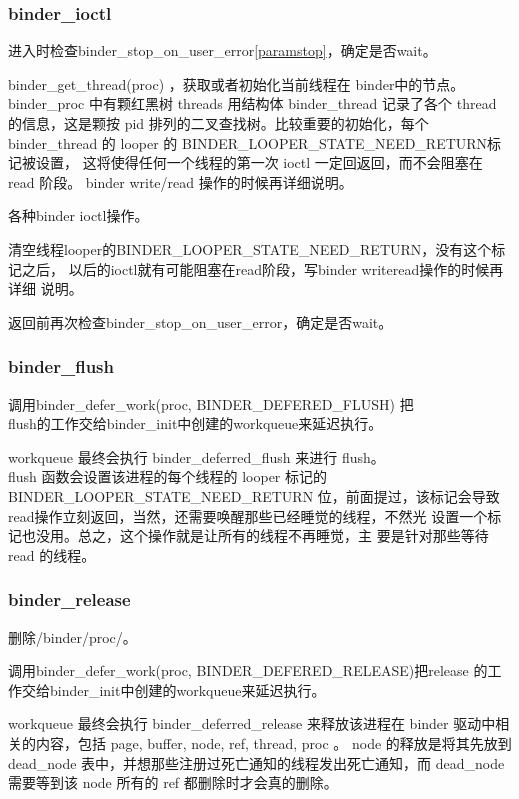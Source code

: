 \documentclass[a4paper,11pt]{article}
\begin{document}
\subsubsection{binder_ioctl}
\begin{itemize*}
    \item 进入时检查binder_stop_on_user_error{\tiny\ref{paramstop}}，确定是否wait。
    \item  binder_get_thread(proc) ，获取或者初始化当前线程在 binder中的节点。
        binder_proc 中有颗红黑树 threads 用结构体 binder_thread 记录了各个
        thread 的信息，这是颗按 pid 排列的二叉查找树。比较重要的初始化，每个
        binder_thread 的 looper 的 BINDER_LOOPER_STATE_NEED_RETURN标记被设置，
        这将使得任何一个线程的第一次 ioctl 一定回返回，而不会阻塞在 read 阶段。
        binder write/read 操作的时候再详细说明。
    \item 各种binder ioctl操作。
    \item 清空线程looper的BINDER_LOOPER_STATE_NEED_RETURN，没有这个标记之后，
        以后的ioctl就有可能阻塞在read阶段，写binder writeread操作的时候再详细
        说明。
    \item 返回前再次检查binder_stop_on_user_error，确定是否wait。
\end{itemize*}

\subsubsection{binder_flush}
\begin{itemize*}
    \item 调用binder_defer_work(proc, BINDER_DEFERED_FLUSH)
        把\\flush的工作交给binder_init中创建的workqueue来延迟执行。
    \item workqueue 最终会执行 binder_deferred_flush 来进行 flush。
        \\flush 函数会设置该进程的每个线程的 looper 标记的
        BINDER_LOOPER_STATE_NEED_RETURN 位，前面提过，该标记会导致
        \\read操作立刻返回，当然，还需要唤醒那些已经睡觉的线程，不然光
        设置一个标记也没用。总之，这个操作就是让所有的线程不再睡觉，主
        要是针对那些等待 read 的线程。
\end{itemize*}

\subsubsection{binder_release}
\begin{itemize*}
    \item 删除/binder/proc/。
    \item 调用binder_defer_work(proc, BINDER_DEFERED_RELEASE)把release
        的工作交给binder_init中创建的workqueue来延迟执行。
    \item  workqueue 最终会执行 binder_deferred_release 来释放该进程在
        binder 驱动中相关的内容，包括 page, buffer, node, ref, thread,
        proc 。 node 的释放是将其先放到 dead_node
        表中，并想那些注册过死亡通知的线程发出死亡通知，而 dead_node
        需要等到该 node 所有的 ref 都删除时才会真的删除。
\end{itemize*}
\end{document}

